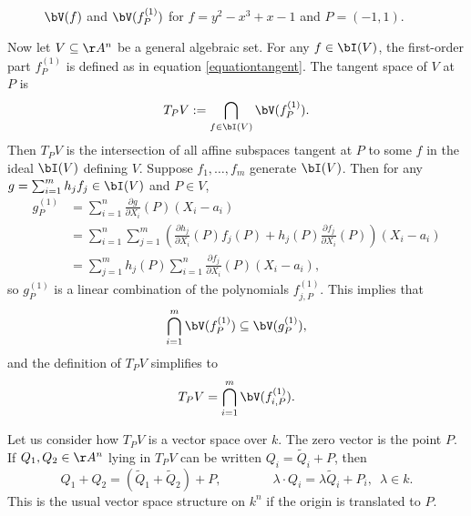 \documentclass[12pt]{amsart}
\theoremstyle{plain}
\begin{document}
\begin{figure}[H]
\centering
{}
\caption*{$\bV(f)$ and $\bV(f_P^{(1)})$ for $f = y^2 - x^3 + x - 1$ and $P=(-1, 1)$.}
\end{figure}

Now let $V\subseteq\AA^n$ be a general algebraic set.
For any $f\in\bI(V)$, the first-order part $f_P^{(1)}$ is defined as in equation \ref{equationtangent}.
The tangent space of $V$ at $P$ is
$$T_PV := \bigcap_{f\in\bI(V)} \bV(f_P^{(1)}).$$
Then $T_PV$ is the intersection of all affine subspaces tangent at $P$ to some $f$ in the ideal $\bI(V)$ defining $V$.
Suppose $f_1, \ldots, f_m$ generate $\bI(V)$.
Then for any $g = \sum_{i=1}^m h_j f_j \in \bI(V)$ and $P \in V$,
\begin{align*}
	g_P^{(1)} &= \sum_{i=1}^n \frac{\partial g}{\partial X_i}(P)(X_i-a_i) \\
		&= \sum_{i=1}^n \sum_{j=1}^m \left(\frac{\partial h_j}{\partial X_i}(P) f_j(P) + h_j(P) \frac{\partial f_j}{\partial X_i}(P)\right) (X_i-a_i) \\
		&= \sum_{j=1}^m h_j(P) \sum_{i=1}^n \frac{\partial f_j}{\partial X_i}(P)(X_i-a_i),
\end{align*}
so $g_P^{(1)}$ is a linear combination of the polynomials $f_{j,P}^{(1)}$.
This implies that 
$$\bigcap_{i=1}^m \bV(f_P^{(1)}) \subseteq \bV(g_P^{(1)}),$$
and the definition of $T_PV$ simplifies to
$$T_PV = \bigcap_{i=1}^m \bV(f_{i,P}^{(1)}).$$

Let us consider how $T_PV$ is a vector space over $k$.
The zero vector is the point $P$.
If $Q_1, Q_2 \in \AA^n$ lying in $T_PV$ can be written $Q_i = \tilde Q_i + P$, then
$$Q_1 + Q_2 = (\tilde Q_1 + \tilde Q_2) + P, \qquad\qquad \lambda \cdot Q_i = \lambda \tilde Q_i + P_i, \,\,\, \lambda \in k.$$
This is the usual vector space structure on $k^n$ if the origin is translated to $P$.
\end{document}

